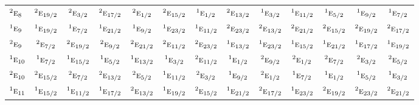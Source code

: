 \documentclass[10pt,a4paper]{article}
\numberwithin{equation}{section}
\newcommand{\irr}[1]{\text{\normalfont\scshape #1}}
\newcommand{\conjpair}[1]{{}^{#1}}
\begin{document}
{\begin{longtable}{@{}lcccccccccccc@{}}
$\conjpair{2}\irr{e}_{8}$ & $\conjpair{2}\irr{e}_{19/2}$ & $\conjpair{2}\irr{e}_{3/2}$ & $\conjpair{2}\irr{e}_{17/2}$ & $\conjpair{2}\irr{e}_{1/2}$ & $\conjpair{2}\irr{e}_{15/2}$ & $\conjpair{1}\irr{e}_{1/2}$ & $\conjpair{2}\irr{e}_{13/2}$ & $\conjpair{1}\irr{e}_{3/2}$ & $\conjpair{1}\irr{e}_{11/2}$ & $\conjpair{1}\irr{e}_{5/2}$ & $\conjpair{1}\irr{e}_{9/2}$ & $\conjpair{1}\irr{e}_{7/2}$\\
$\conjpair{1}\irr{e}_{9}$ & $\conjpair{1}\irr{e}_{19/2}$ & $\conjpair{1}\irr{e}_{7/2}$ & $\conjpair{1}\irr{e}_{21/2}$ & $\conjpair{1}\irr{e}_{9/2}$ & $\conjpair{1}\irr{e}_{23/2}$ & $\conjpair{1}\irr{e}_{11/2}$ & $\conjpair{2}\irr{e}_{23/2}$ & $\conjpair{2}\irr{e}_{13/2}$ & $\conjpair{2}\irr{e}_{21/2}$ & $\conjpair{2}\irr{e}_{15/2}$ & $\conjpair{2}\irr{e}_{19/2}$ & $\conjpair{2}\irr{e}_{17/2}$\\
$\conjpair{2}\irr{e}_{9}$ & $\conjpair{2}\irr{e}_{7/2}$ & $\conjpair{2}\irr{e}_{19/2}$ & $\conjpair{2}\irr{e}_{9/2}$ & $\conjpair{2}\irr{e}_{21/2}$ & $\conjpair{2}\irr{e}_{11/2}$ & $\conjpair{2}\irr{e}_{23/2}$ & $\conjpair{1}\irr{e}_{13/2}$ & $\conjpair{1}\irr{e}_{23/2}$ & $\conjpair{1}\irr{e}_{15/2}$ & $\conjpair{1}\irr{e}_{21/2}$ & $\conjpair{1}\irr{e}_{17/2}$ & $\conjpair{1}\irr{e}_{19/2}$\\
$\conjpair{1}\irr{e}_{10}$ & $\conjpair{1}\irr{e}_{7/2}$ & $\conjpair{1}\irr{e}_{15/2}$ & $\conjpair{1}\irr{e}_{5/2}$ & $\conjpair{1}\irr{e}_{13/2}$ & $\conjpair{1}\irr{e}_{3/2}$ & $\conjpair{2}\irr{e}_{11/2}$ & $\conjpair{1}\irr{e}_{1/2}$ & $\conjpair{2}\irr{e}_{9/2}$ & $\conjpair{2}\irr{e}_{1/2}$ & $\conjpair{2}\irr{e}_{7/2}$ & $\conjpair{2}\irr{e}_{3/2}$ & $\conjpair{2}\irr{e}_{5/2}$\\
$\conjpair{2}\irr{e}_{10}$ & $\conjpair{2}\irr{e}_{15/2}$ & $\conjpair{2}\irr{e}_{7/2}$ & $\conjpair{2}\irr{e}_{13/2}$ & $\conjpair{2}\irr{e}_{5/2}$ & $\conjpair{1}\irr{e}_{11/2}$ & $\conjpair{2}\irr{e}_{3/2}$ & $\conjpair{1}\irr{e}_{9/2}$ & $\conjpair{2}\irr{e}_{1/2}$ & $\conjpair{1}\irr{e}_{7/2}$ & $\conjpair{1}\irr{e}_{1/2}$ & $\conjpair{1}\irr{e}_{5/2}$ & $\conjpair{1}\irr{e}_{3/2}$\\
$\conjpair{1}\irr{e}_{11}$ & $\conjpair{1}\irr{e}_{15/2}$ & $\conjpair{1}\irr{e}_{11/2}$ & $\conjpair{1}\irr{e}_{17/2}$ & $\conjpair{2}\irr{e}_{13/2}$ & $\conjpair{1}\irr{e}_{19/2}$ & $\conjpair{2}\irr{e}_{15/2}$ & $\conjpair{1}\irr{e}_{21/2}$ & $\conjpair{2}\irr{e}_{17/2}$ & $\conjpair{1}\irr{e}_{23/2}$ & $\conjpair{2}\irr{e}_{19/2}$ & $\conjpair{2}\irr{e}_{23/2}$ & $\conjpair{2}\irr{e}_{21/2}$\\

\end{longtable}}
\end{document}
